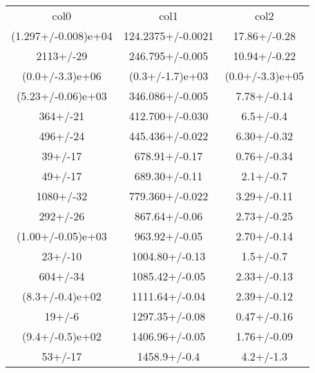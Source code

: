\begin{table}
\begin{tabular}{ccc}
col0 & col1 & col2 \\
(1.297+/-0.008)e+04 & 124.2375+/-0.0021 & 17.86+/-0.28 \\
2113+/-29 & 246.795+/-0.005 & 10.94+/-0.22 \\
(0.0+/-3.3)e+06 & (0.3+/-1.7)e+03 & (0.0+/-3.3)e+05 \\
(5.23+/-0.06)e+03 & 346.086+/-0.005 & 7.78+/-0.14 \\
364+/-21 & 412.700+/-0.030 & 6.5+/-0.4 \\
496+/-24 & 445.436+/-0.022 & 6.30+/-0.32 \\
39+/-17 & 678.91+/-0.17 & 0.76+/-0.34 \\
49+/-17 & 689.30+/-0.11 & 2.1+/-0.7 \\
1080+/-32 & 779.360+/-0.022 & 3.29+/-0.11 \\
292+/-26 & 867.64+/-0.06 & 2.73+/-0.25 \\
(1.00+/-0.05)e+03 & 963.92+/-0.05 & 2.70+/-0.14 \\
23+/-10 & 1004.80+/-0.13 & 1.5+/-0.7 \\
604+/-34 & 1085.42+/-0.05 & 2.33+/-0.13 \\
(8.3+/-0.4)e+02 & 1111.64+/-0.04 & 2.39+/-0.12 \\
19+/-6 & 1297.35+/-0.08 & 0.47+/-0.16 \\
(9.4+/-0.5)e+02 & 1406.96+/-0.05 & 1.76+/-0.09 \\
53+/-17 & 1458.9+/-0.4 & 4.2+/-1.3 \\
\end{tabular}
\end{table}
